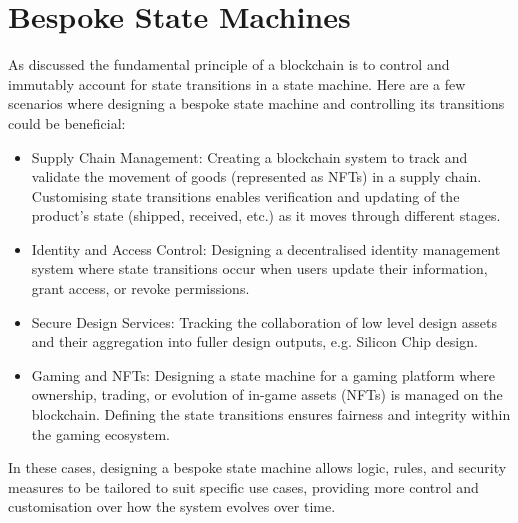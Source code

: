 \documentclass{tufte-handout}
\begin{document}
\section{Bespoke State Machines}\label{sec:page-layout}
As discussed the fundamental principle of a blockchain is to control and immutably account for state transitions in a state machine.  Here are a few scenarios where designing a bespoke state
machine and controlling its transitions could be beneficial:
\begin{itemize}
\item Supply Chain Management: Creating a blockchain system to track and validate the movement of goods (represented as NFTs) in a supply chain. Customising state transitions enables
verification and updating of the product's state (shipped, received, etc.) as it moves through different stages.
\item Identity and Access Control: Designing a decentralised identity management system where state transitions occur when users update their information, grant access,
or revoke permissions.
\item Secure Design Services: Tracking the collaboration of low level design assets and their aggregation into fuller design outputs, e.g. Silicon Chip design.
\item Gaming and NFTs: Designing a state machine for a gaming platform where ownership, trading, or evolution of in-game assets (NFTs) is managed on the blockchain. Defining
the state transitions ensures fairness and integrity within the gaming ecosystem.
\end{itemize}
In these cases, designing a bespoke state machine allows logic, rules, and security measures to be tailored to suit specific use cases, providing more control and customisation over how
the system evolves over time.
\end{document}
